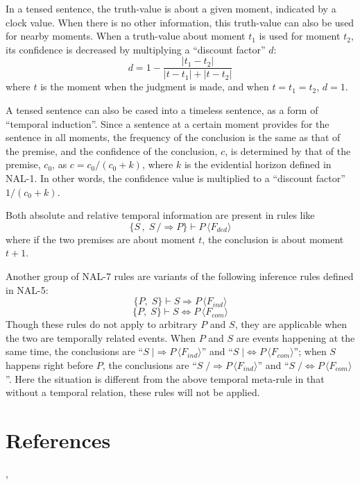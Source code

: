 In a tensed sentence, the truth-value is about a given moment, indicated by a clock value. When there is no other information, this truth-value can also be used for nearby moments. When a truth-value about moment $t_1$ is used for moment $t_2$, its confidence is decreased by multiplying a ``discount factor'' $d$:
\[d = 1 - \frac{|t_1 - t_2|}{|t - t_1| + |t - t_2|}\]
where $t$ is the moment when the judgment is made, and when \(t = t_1 = t_2\), $d=1$.

A tensed sentence can also be cased into a timeless sentence, as a form of ``temporal induction''. Since a sentence at a certain moment provides for the sentence in all moments, the frequency of the conclusion is the same as that of the premise, and the confidence of the conclusion, $c$, is determined by that of the premise, $c_0$, as \(c = c_0/(c_0+k)\), where $k$ is the evidential horizon defined in NAL-1. In other words, the confidence value is multiplied to a ``discount factor'' \(1/(c_0+k)\).

Both absolute and relative temporal information are present in rules like 
\[\{S \, , \; S \,/\!\!\!\Rightarrow P\} \vdash P \, \langle F_{ded}\rangle \]
where if the two premises are about moment $t$, the conclusion is about moment $t+1$.

Another group of NAL-7 rules are variants of the following inference rules defined in NAL-5:
\[\{P, \; S\} \vdash S \Rightarrow P \, \langle F_{ind}\rangle \]
\[\{P, \; S\} \vdash S \Leftrightarrow P \, \langle F_{com}\rangle \]
Though these rules do not apply to arbitrary $P$ and $S$, they are applicable when the two are temporally related events. When $P$ and $S$ are events happening at the same time, the conclusions are ``\(S \; |\!\!\!\Rightarrow P \, \langle F_{ind}\rangle\)'' and ``\(S \; |\!\!\!\Leftrightarrow P \, \langle F_{com}\rangle\)''; when $S$ happens right before $P$, the conclusions are ``\(S \; /\!\!\!\Rightarrow P \, \langle F_{ind}\rangle\)'' and ``\(S \; /\!\!\!\Leftrightarrow P \, \langle F_{com}\rangle\)''. Here the situation is different from the above temporal meta-rule in that without a temporal relation, these rules will not be applied.










\section*{References}

\cite[Chapter 5]{wp:book1}, \cite{wp:unify,wp:agi}
